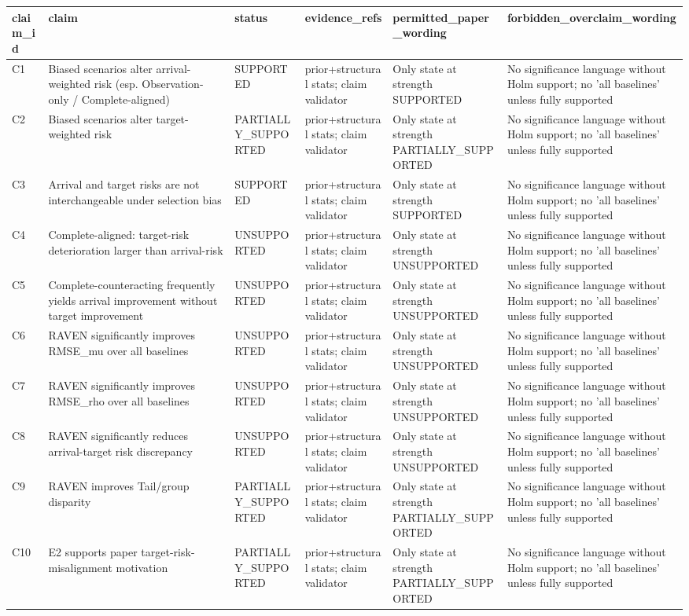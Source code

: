 \begin{tabular}{llllll}
\toprule
claim_id & claim & status & evidence_refs & permitted_paper_wording & forbidden_overclaim_wording \\
\midrule
C1 & Biased scenarios alter arrival-weighted risk (esp. Observation-only / Complete-aligned) & SUPPORTED & prior+structural stats; claim validator & Only state at strength SUPPORTED & No significance language without Holm support; no 'all baselines' unless fully supported \\
C2 & Biased scenarios alter target-weighted risk & PARTIALLY_SUPPORTED & prior+structural stats; claim validator & Only state at strength PARTIALLY_SUPPORTED & No significance language without Holm support; no 'all baselines' unless fully supported \\
C3 & Arrival and target risks are not interchangeable under selection bias & SUPPORTED & prior+structural stats; claim validator & Only state at strength SUPPORTED & No significance language without Holm support; no 'all baselines' unless fully supported \\
C4 & Complete-aligned: target-risk deterioration larger than arrival-risk & UNSUPPORTED & prior+structural stats; claim validator & Only state at strength UNSUPPORTED & No significance language without Holm support; no 'all baselines' unless fully supported \\
C5 & Complete-counteracting frequently yields arrival improvement without target improvement & UNSUPPORTED & prior+structural stats; claim validator & Only state at strength UNSUPPORTED & No significance language without Holm support; no 'all baselines' unless fully supported \\
C6 & RAVEN significantly improves RMSE_mu over all baselines & UNSUPPORTED & prior+structural stats; claim validator & Only state at strength UNSUPPORTED & No significance language without Holm support; no 'all baselines' unless fully supported \\
C7 & RAVEN significantly improves RMSE_rho over all baselines & UNSUPPORTED & prior+structural stats; claim validator & Only state at strength UNSUPPORTED & No significance language without Holm support; no 'all baselines' unless fully supported \\
C8 & RAVEN significantly reduces arrival-target risk discrepancy & UNSUPPORTED & prior+structural stats; claim validator & Only state at strength UNSUPPORTED & No significance language without Holm support; no 'all baselines' unless fully supported \\
C9 & RAVEN improves Tail/group disparity & PARTIALLY_SUPPORTED & prior+structural stats; claim validator & Only state at strength PARTIALLY_SUPPORTED & No significance language without Holm support; no 'all baselines' unless fully supported \\
C10 & E2 supports paper target-risk-misalignment motivation & PARTIALLY_SUPPORTED & prior+structural stats; claim validator & Only state at strength PARTIALLY_SUPPORTED & No significance language without Holm support; no 'all baselines' unless fully supported \\
\bottomrule
\end{tabular}
